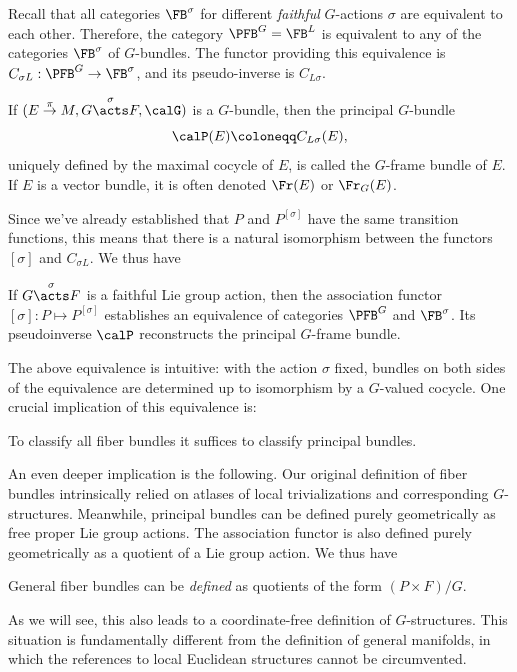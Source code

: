 Recall that all categories $\FB^\sigma$ for different \emph{faithful} $G$-actions $\sigma$ are equivalent to each other. Therefore, the category $\PFB^G=\FB^L$ is equivalent to any of the categories $\FB^\sigma$ of $G$-bundles. The functor providing this equivalence is $C_{\sigma L}:\PFB^G\to \FB^\sigma$, and its pseudo-inverse is $C_{L\sigma}$. 

\begin{defn}
    If $(E\overset{\pi}{\to}M,G\overset{\sigma}{\acts}F,\calG)$ is a $G$-bundle, then the principal $G$-bundle \[\calP(E)\coloneqq C_{L\sigma}(E),\] uniquely defined by the maximal cocycle of $E$, is called the $G$-frame bundle of $E$. If $E$ is a vector bundle, it is often denoted $\Fr(E)$ or $\Fr_G(E)$.
\end{defn}

Since we've already established that $P$ and $P^{[\sigma]}$ have the same transition functions, this means that there is a natural isomorphism between the functors $[\sigma]$ and $C_{\sigma L}$. We thus have
\begin{prop}
    If $G\overset{\sigma}{\acts}F$ is a faithful Lie group action, then the association functor $[\sigma]:P\mapsto P^{[\sigma]}$ establishes an equivalence of categories $\PFB^G$ and $\FB^\sigma$. Its pseudoinverse $\calP$ reconstructs the principal $G$-frame bundle.
\end{prop}

\begin{rem}
    The above equivalence is intuitive: with the action $\sigma$ fixed, bundles on both sides of the equivalence are determined up to isomorphism by a $G$-valued cocycle. One crucial implication of this equivalence is:
    \begin{center}
        To classify all fiber bundles it suffices to classify principal bundles.
    \end{center}
    An even deeper implication is the following. Our original definition of fiber bundles intrinsically relied on atlases of local trivializations and corresponding $G$-structures. Meanwhile, principal bundles can be defined purely geometrically as free proper Lie group actions. The association functor is also defined purely geometrically as a quotient of a Lie group action. We thus have
    \begin{center}
        General fiber bundles can be \emph{defined} as quotients of the form $(P\times F)\slash G$.
    \end{center}
    As we will see, this also leads to a coordinate-free definition of $G$-structures. This situation is fundamentally different from the definition of general manifolds, in which the references to local Euclidean structures cannot be circumvented.
\end{rem}

